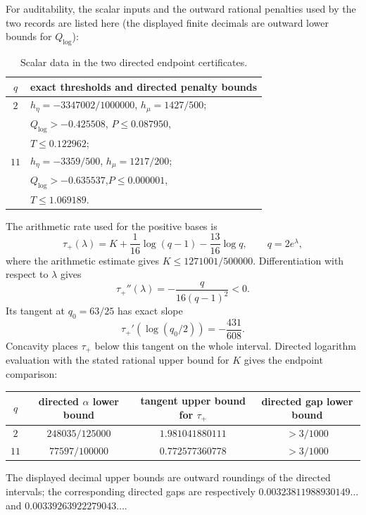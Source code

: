 For auditability, the scalar inputs and the outward rational penalties used
by the two records are listed here (the displayed finite decimals are
outward lower bounds for $Q_{\log}$):
\begin{table}[ht]
\centering
\caption{Scalar data in the two directed endpoint certificates.}
\label{tab:p0-q-bounds}
\renewcommand{\arraystretch}{1.12}
 {\normalsize
\begin{tabular}{@{}c l@{}}
\toprule
$q$ & exact thresholds and directed penalty bounds\\
\midrule
$2$ & $h_\eta=-3347002/1000000$, $h_\mu=1427/500$;\\
    & $Q_{\log}>-0.425508$,\quad
      $P\le0.087950$,\\
    & $T\le0.122962$;\\[2pt]
$11$ & $h_\eta=-3359/500$, $h_\mu=1217/200$;\\
    & $Q_{\log}>-0.635537$,\quad $P\le0.000001$,\\
    & $T\le1.069189$.\\
\bottomrule
\end{tabular}}
\end{table}

The arithmetic rate used for the positive bases is
\[
 \tau_+(\lambda)=K+\frac1{16}\log(q-1)-\frac{13}{16}\log q,
                    \qquad q=2e^\lambda,
\]
where the arithmetic estimate gives $K\le1271001/500000$.  Differentiation
with respect to $\lambda$ gives
\[
 \tau_+''(\lambda)=-\frac{q}{16(q-1)^2}<0.
\]
Its tangent at $q_0=63/25$ has exact slope
\[
 \tau_+'(\log(q_0/2))=-\frac{431}{608}.
\]
Concavity places $\tau_+$ below this tangent on the whole interval.  Directed
logarithm evaluation with the stated rational upper bound for $K$ gives the
endpoint comparison:
\begin{center}
\renewcommand{\arraystretch}{1.12}
 {\normalsize
\begin{tabular}{@{}c c c c@{}}
\toprule
$q$ & directed $\alpha$ lower bound & tangent upper bound for $\tau_+$
     & directed gap lower bound\\
\midrule
$2$ & $248035/125000$ & $1.981041880111$ & $>3/1000$\\
$11$ & $77597/100000$ & $0.772577360778$ & $>3/1000$\\
\bottomrule
\end{tabular}}
\end{center}
The displayed decimal upper bounds are outward roundings of the directed
intervals; the corresponding directed gaps are respectively
$0.00323811988930149\ldots$ and $0.00339263922279043\ldots$.

